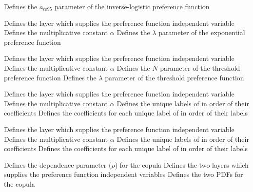  {Defines the $a_{to95}$ parameter of the inverse-logistic preference function}
\par\textbf{}\par
{} {Defines the layer which supplies the preference function independent variable}
 {Defines the multiplicative constant $\alpha$}
 {Defines the $\lambda$ parameter of the exponential preference function}
\par\textbf{}\par
{} {Defines the layer which supplies the preference function independent variable}
 {Defines the multiplicative constant $\alpha$}
 {Defines the $N$ parameter of the threshold preference function}
 {Defines the $\lambda$ parameter of the threshold preference function}
\par\textbf{}\par
{} {Defines the layer which supplies the preference function independent variable}
 {Defines the multiplicative constant $\alpha$}
 {Defines the unique labels of  in order of their coefficients}
 {Defines the coefficients for each unique label of  in order of their labels}
\par\textbf{}\par
{} {Defines the layer which supplies the preference function independent variable}
 {Defines the multiplicative constant $\alpha$}
 {Defines the unique labels of  in order of their coefficients}
 {Defines the coefficients for each unique label of  in order of their labels}
\par\textbf{}\par
{} {Defines the dependence parameter ($\rho$) for the copula}
 {Defines the two layers which supplies the preference function independent variables}
 {Defines the two PDFs for the copula}
\par\textbf{}\par
